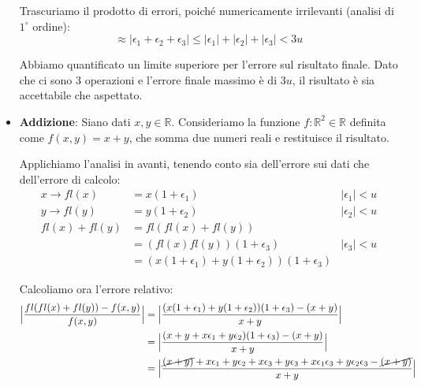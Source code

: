 \documentclass{article}
\numberwithin{equation}{section}
\begin{document}
\begin{itemize}
        Trascuriamo il prodotto di errori, poiché numericamente irrilevanti
        (analisi di $1^{\circ}$ ordine):
        $$\approx \lvert \epsilon_1+\epsilon_2+\epsilon_3\rvert \leq \lvert
        \epsilon_1\rvert+\lvert \epsilon_2\rvert+\lvert \epsilon_3\rvert<3u$$

        Abbiamo quantificato un limite superiore per l'errore sul risultato
        finale. Dato che ci sono 3 operazioni e l'errore finale massimo è di
        $3u$, il risultato è sia accettabile che aspettato.
    \item \textbf{Addizione}:
        Siano dati $x,y\in \mathbb{R}$. Consideriamo la funzione $f:
        \mathbb{R}^2\in \mathbb{R}$ definita come $f(x,y)=x+y$, che somma due
        numeri reali e restituisce il risultato.

        Applichiamo l'analisi in avanti, tenendo conto sia dell'errore sui dati che dell'errore di calcolo:
        \begin{equation*}
           \begin{aligned}
                x \rightarrow fl(x) &= x(1+\epsilon_1) & |\epsilon_1| < u \\
                y \rightarrow fl(y) &= y(1+\epsilon_2) & |\epsilon_2| < u \\
                fl(x) + fl(y) &= fl(fl(x)+fl(y)) \\
                              &= (fl(x)fl(y))(1+\epsilon_3) & |\epsilon_3| < u \\
                              &= (x(1+\epsilon_1) + y(1+\epsilon_2))(1+\epsilon_3)
           \end{aligned} 
        \end{equation*}

        Calcoliamo ora l'errore relativo:
        \begin{equation*}
           \begin{aligned}
                \Big\lvert \frac{fl(fl(x) + fl(y)) - f(x,y)}{f(x,y)}
                \Big\rvert &= \Big\lvert \frac{(x(1+\epsilon_1) +
                y(1+\epsilon_2))(1+\epsilon_3) - (x + y)}{x + y} \Big\rvert \\
                &= \Big\lvert
                \frac{(x+y+x\epsilon_1+y\epsilon_2)(1+\epsilon_3)-(x+y)}{x + y} \Big\rvert \\
                &= \Big\lvert
                \frac{\cancel{(x+y)}+x\epsilon_1+y\epsilon_2+x\epsilon_3+y\epsilon_3+x\epsilon_1\epsilon_3+y\epsilon_2\epsilon_3-\cancel{(x+y)}}{x+y}\Big\rvert
           \end{aligned} 
        \end{equation*}
        

\end{itemize}
\end{document}

